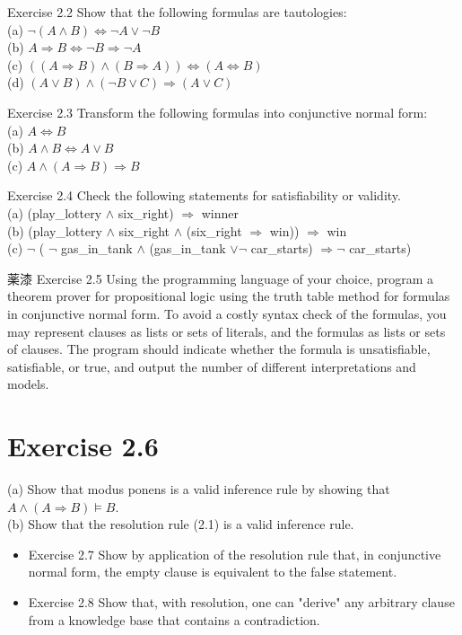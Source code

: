 \documentclass[10pt]{article}
\begin{document}
Exercise 2.2 Show that the following formulas are tautologies:\\
(a) $\neg(A \wedge B) \Leftrightarrow \neg A \vee \neg B$\\
(b) $A \Rightarrow B \Leftrightarrow \neg B \Rightarrow \neg A$\\
(c) $((A \Rightarrow B) \wedge(B \Rightarrow A)) \Leftrightarrow(A \Leftrightarrow B)$\\
(d) $(A \vee B) \wedge(\neg B \vee C) \Rightarrow(A \vee C)$

Exercise 2.3 Transform the following formulas into conjunctive normal form:\\
(a) $A \Leftrightarrow B$\\
(b) $A \wedge B \Leftrightarrow A \vee B$\\
(c) $A \wedge(A \Rightarrow B) \Rightarrow B$

Exercise 2.4 Check the following statements for satisfiability or validity.\\
(a) (play\_lottery $\wedge$ six\_right) $\Rightarrow$ winner\\
(b) (play\_lottery $\wedge$ six\_right $\wedge$ (six\_right $\Rightarrow$ win)) $\Rightarrow$ win\\
(c) $\neg$ ( $\neg$ gas\_in\_tank $\wedge$ (gas\_in\_tank $\vee \neg$ car\_starts) $\Rightarrow \neg$ car\_starts)

薬漆 Exercise 2.5 Using the programming language of your choice, program a theorem prover for propositional logic using the truth table method for formulas in conjunctive normal form. To avoid a costly syntax check of the formulas, you may represent clauses as lists or sets of literals, and the formulas as lists or sets of clauses. The program should indicate whether the formula is unsatisfiable, satisfiable, or true, and output the number of different interpretations and models.

\section*{Exercise 2.6}
(a) Show that modus ponens is a valid inference rule by showing that $A \wedge(A \Rightarrow B) \models B$.\\
(b) Show that the resolution rule (2.1) is a valid inference rule.

\begin{itemize}
  \item Exercise 2.7 Show by application of the resolution rule that, in conjunctive normal form, the empty clause is equivalent to the false statement.
  \item Exercise 2.8 Show that, with resolution, one can "derive" any arbitrary clause from a knowledge base that contains a contradiction.
\end{itemize}
\end{document}
